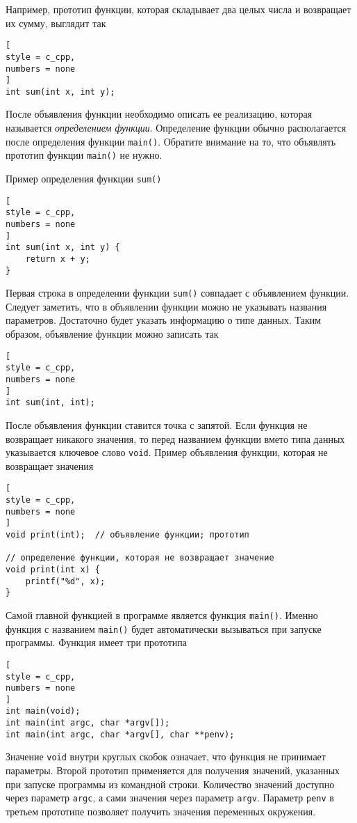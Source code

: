 \documentclass[%
	11pt,
	a4paper,
	utf8,
		]{article}
\begin{document}
Например, прототип функции, которая складывает два целых числа и возвращает их сумму, выглядит так
\begin{lstlisting}[
style = c_cpp,
numbers = none
]
int sum(int x, int y);
\end{lstlisting}

После объявления функции необходимо описать ее реализацию, которая называется \emph{определением функции}. Определение функции обычно располагается после определения функции \verb|main()|. Обратите внимание на то, что объявлять прототип функции \verb|main()| не нужно.

Пример определения функции \verb|sum()|
\begin{lstlisting}[
style = c_cpp,
numbers = none
]
int sum(int x, int y) {
    return x + y;
}
\end{lstlisting}

Первая строка в определении функции \verb|sum()| совпадает с объявлением функции. Следует заметить, что в объявлении функции можно не указывать названия параметров. Достаточно будет указать информацию о типе данных. Таким образом, объявление функции можно записать так
\begin{lstlisting}[
style = c_cpp,
numbers = none
]
int sum(int, int);
\end{lstlisting}

После объявления функции ставится точка с запятой. Если функция не возвращает никакого значения, то перед названием функции вмето типа данных указывается ключевое слово \verb|void|. Пример объявления функции, которая не возвращает значения
\begin{lstlisting}[
style = c_cpp,
numbers = none
]
void print(int);  // объявление функции; прототип

// определение функции, которая не возвращает значение
void print(int x) {
    printf("%d", x);
}
\end{lstlisting}

Самой главной функцией в программе является функция \verb|main()|. Именно функция с названием \verb|main()| будет автоматически вызываться при запуске программы. Функция имеет три прототипа
\begin{lstlisting}[
style = c_cpp,
numbers = none
]
int main(void);
int main(int argc, char *argv[]);
int main(int argc, char *argv[], char **penv);
\end{lstlisting}

Значение \verb|void| внутри круглых скобок означает, что функция не принимает параметры. Второй прототип применяется для получения значений, указанных при запуске программы из командной строки. Количество значений доступно через параметр \verb|argc|, а сами значения через параметр \verb|argv|. Параметр \verb|penv| в третьем прототипе позволяет получить значения переменных окружения.
\end{document}
